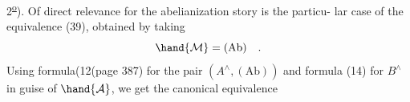 2\textsuperscript{\uline{o}}).  Of direct relevance for the abelianization story is the particu-%
lar case of the equivalence (39),  obtained by taking
\[ \hand{\mathcal{M}} = (\mathrm{Ab}) \quad . \]
Using formula(12\over{)}{)}(page 387) for the pair $(A^{\wedge},(\mathrm{Ab}))$  and formula (14)
for $B^{\wedge}$ in guise of $\hand{\mathcal{A}}$,  we get  the canonical equivalence

